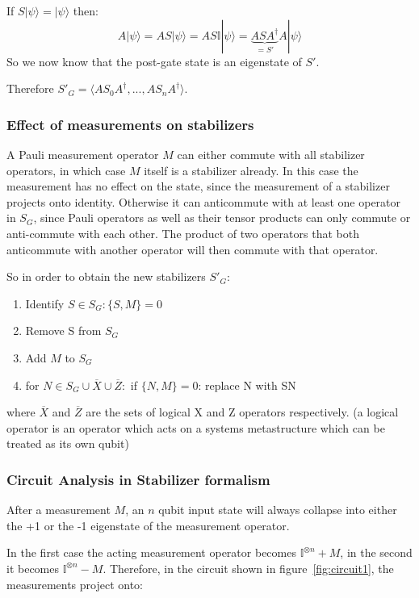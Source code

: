 If $S|\psi\rangle = |\psi\rangle$ then:
\begin{equation}
A|\psi\rangle = AS|\psi\rangle = AS\mathbb{I}|\psi\rangle
	= \underbrace{ASA^{\dagger}}_{=S'}A|\psi\rangle
\end{equation}
So we now know that the post-gate state is an eigenstate of $S'$.

Therefore $S'_{G} = \langle AS_{0}A^{\dagger},...,AS_{n}A^{\dagger}\rangle$.


\subsubsection{Effect of measurements on stabilizers}
A Pauli measurement operator $M$ can either commute with all stabilizer
operators, in which case $M$ itself is a stabilizer already. In this case
the measurement has no effect on the state, since the measurement of a
stabilizer projects onto identity.
Otherwise it can anticommute with at
least one operator in $S_{G}$, since Pauli operators as well as
their tensor products can only commute or anti-commute with each
other. The product of two operators that both anticommute with another operator
will then commute with that operator.

So in order to obtain the new stabilizers  $S'_{G}$:
\begin{enumerate}
	\item Identify $S\in S_{G}: \{S,M\}=0$
	\item Remove S from $S_G$
	\item Add $M$ to $S_G$ 
	\item for $N \in S_G \cup\overline{X}\cup\overline{Z}:$
		if $\{N,M\}=0$: replace N with SN
\end{enumerate}
where $\overline{X}$ and $\overline{Z}$ are the sets of 
logical X and Z operators respectively. (a logical operator is
an operator which acts on a systems metastructure which can be treated
as its own qubit)

\subsubsection{Circuit Analysis in Stabilizer formalism}
After a measurement $M$, an $n$ qubit input state will always 
collapse into either the +1 or the -1 eigenstate of the 
measurement operator.

In the first case the acting measurement operator becomes 
$\mathbb{I}^{\otimes n}+M$, in the second it becomes
$\mathbb{I}^{\otimes n}-M$. Therefore, in the circuit shown in 
figure~\ref{fig:circuit1}, the measurements project onto:

